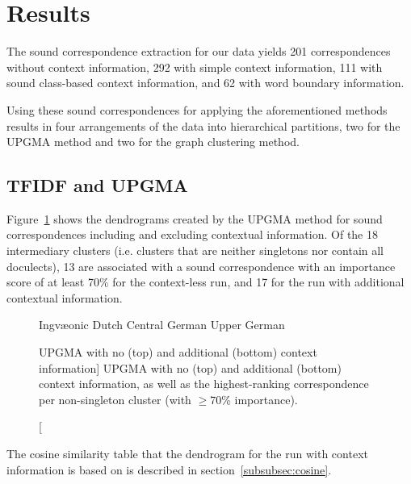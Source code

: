 \documentclass[a4paper]{article}
\def\upper{\color{red}\FilledBigTriangleUp}
\def\central{\color{Dandelion}\FilledBigSquare}
\def\dutch{\color{ForestGreen}\FilledBigCircle}
\def\ingv{\color{Blue}\BigCircle}
\begin{document}
\section{Results}
\label{sec:results}

The sound correspondence extraction for our data
yields 201 correspondences without context information,
292 with simple context information,
111 with sound class-based context information,
and 62 with word boundary information.

Using these sound correspondences for
applying the aforementioned methods results in
four arrangements of the data into hierarchical partitions,
two for the UPGMA method and two for the graph clustering method.

\subsection{TFIDF and UPGMA}

Figure~\ref{fig:tfidf-dendrograms} shows the dendrograms
created by the UPGMA method for sound correspondences
including and excluding contextual information.
Of the 18 intermediary clusters
(i.e. clusters that are neither singletons nor contain all doculects),
13 are associated with a sound correspondence with an importance score of at least 70\% for the context-less run,
and 17 for the run with additional contextual information.

\begin{figure}[h]


\vspace{0.3em}
\begin{center}
{\ingv} Ingv\ae{}onic \hspace{1em}
{\dutch} Dutch \hspace{1em}
{\central} Central German \hspace{1em}
{\upper} Upper German
\end{center}
\caption
[UPGMA with no (top) and additional (bottom) context information]
{UPGMA with no (top) and additional (bottom) context information,
as well as the highest-ranking correspondence per non-singleton cluster
(with $\geq$70\% importance).}
\label{fig:tfidf-dendrograms}
\end{figure}

The cosine similarity table that the dendrogram
for the run with context information is based on
is described in section~\ref{subsubsec:cosine}.
\end{document}
